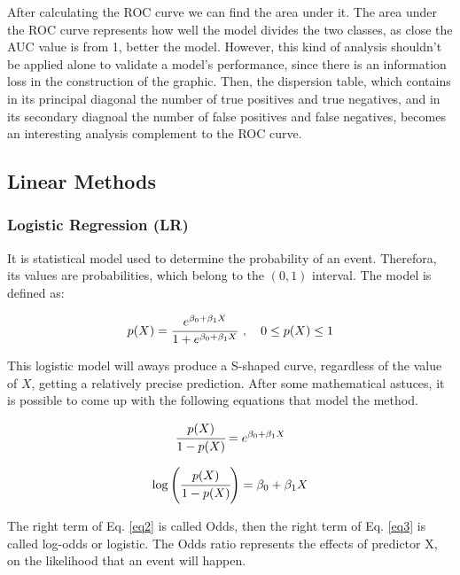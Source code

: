 After calculating the ROC curve we can find the area under it. The area under the ROC curve
represents how well the model divides the two classes, as close the AUC value is from 1, 
better the model. However, this kind of analysis shouldn't be applied alone to validate
 a model's performance, since there is an information loss in the construction of the 
 graphic. Then, the dispersion table, which contains in its principal diagonal the number
 of true positives and true negatives, and in its secondary diagnoal the number of 
 false positives and false negatives, becomes an interesting analysis complement to the 
 ROC curve.

\subsection{Linear Methods}
\subsubsection{Logistic Regression (LR)}
It is statistical model used to determine the probability of an event. Therefora, its values 
are probabilities, which belong to the $(0,1)$ interval. 
The model is defined as:

\begin{equation}
   p(X) = \cfrac{e^{\beta_0 + \beta_1X}}{1+e^{\beta_0 + \beta_1X}} \hspace{0.15cm}, \hspace{0.35cm} 0\leq p(X) \leq 1 \label{eq1}
\end{equation}

This logistic model will aways produce a S-shaped curve, regardless of the value of $X$, 
getting a relatively precise prediction. After some mathematical astuces, it is possible 
to come up with the following equations that model the method.

\begin{equation}
    \cfrac{p(X)}{1-p(X)} = e^{\beta_0+\beta_1X} \label{eq2}
\end{equation}

\begin{equation}
    \log \left(\cfrac{p(X)}{1-p(X)}\right) = \beta_0+\beta_1X \label{eq3}
\end{equation}

The right term of Eq. \eqref{eq2} is called Odds, then the right term of Eq. \eqref{eq3} is 
called log-odds or logistic. The Odds ratio represents the effects of predictor X, on the
likelihood that an event will happen.

